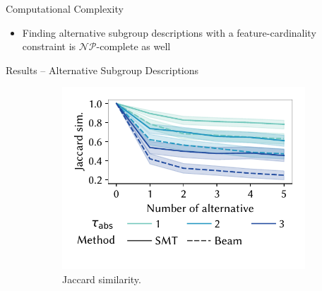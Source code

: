 \documentclass[en, navbaroff, handout]{sdqbeamer}
\begin{document}
\begin{frame}[t]{Computational Complexity}
\begin{itemize}
\begin{itemize}
			\item Finally, optimizing subgroup quality typically at least as hard as finding perfect subgroup
		\end{itemize}
		\vspace{\baselineskip}
		\item Finding alternative subgroup descriptions with a feature-cardinality constraint is $\mathcal{NP}$-complete as well
	\end{itemize}
\end{frame}

\begin{frame}[t]{Results -- Alternative Subgroup Descriptions}
	\begin{figure}[t]
		\centering
		\begin{subfigure}[t]{0.32\textwidth}
			\centering
			\includegraphics[width=\textwidth, trim=10 25 10 10, clip]{plots/csd-alternatives-jaccard.pdf}
			\caption{Jaccard similarity.}
			\label{fig:csd:alternatives-jaccard}
		\end{subfigure}
		\hfill
		\begin{subfigure}[t]{0.32\textwidth}

\end{subfigure}
\end{figure}
\end{frame}
\end{document}
